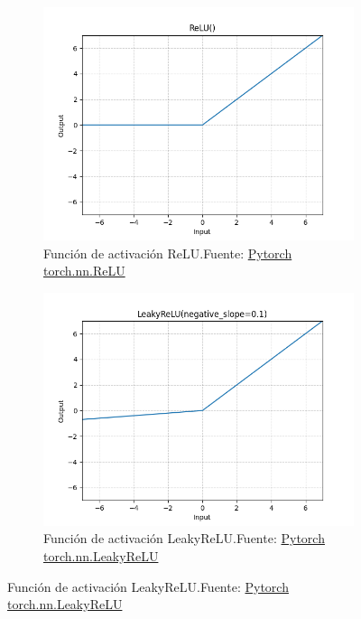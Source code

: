 \begin{figure}[H]
  \centering
  \captionsetup{justification=centering}

  \begin{subfigure}{.475\linewidth}
    \centering
    \includegraphics[width=0.75\linewidth]{figures/equations/ReLU.png}
    \caption{Función de activación ReLU.\newline{}Fuente: \href{https://pytorch.org/docs/stable/generated/torch.nn.ReLU.html}{Pytorch torch.nn.ReLU}}
    \label{subfig:torch.nn.ReLU}
  \end{subfigure}\hfill %
  \begin{subfigure}{.475\linewidth}
    \centering
    \includegraphics[width=0.75\linewidth]{figures/equations/LeakyReLU.png}
    \caption{Función de activación LeakyReLU.\newline{}Fuente: \href{https://pytorch.org/docs/stable/generated/torch.nn.LeakyReLU.html}{Pytorch torch.nn.LeakyReLU}}
    \label{subfig:torch.nn.LeakyReLU}
  \end{subfigure}


\end{figure}
